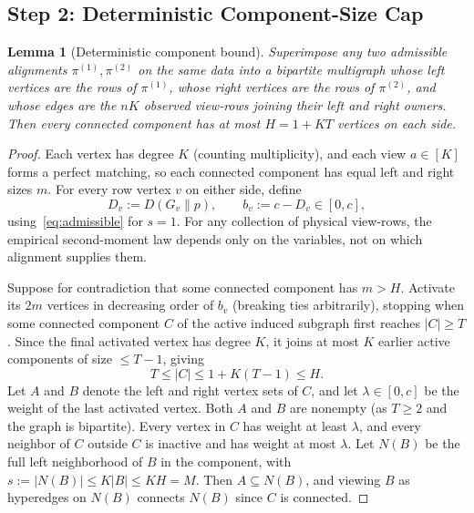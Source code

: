 \documentclass[11pt]{article}
\theoremstyle{plain}
\newtheorem{lemma}[theorem]{Lemma}
\theoremstyle{definition}
\theoremstyle{remark}
\begin{document}
\subsection{Step 2: Deterministic Component-Size Cap}

\begin{lemma}[Deterministic component bound]\label{lem:component}
Superimpose any two admissible alignments $\pi^{(1)}, \pi^{(2)}$ on the same data into a bipartite multigraph whose left vertices are the rows of $\pi^{(1)}$, whose right vertices are the rows of $\pi^{(2)}$, and whose edges are the $nK$ observed view-rows joining their left and right owners.
Then every connected component has at most $H = 1 + KT$ vertices on each side.
\end{lemma}

\begin{proof}
Each vertex has degree $K$ (counting multiplicity), and each view $a \in [K]$ forms a perfect matching, so each connected component has equal left and right sizes $m$.
For every row vertex $v$ on either side, define
\[
D_v := D(G_v \| p), \qquad b_v := c - D_v \in [0, c],
\]
using~\eqref{eq:admissible} for $s = 1$.
For any collection of physical view-rows, the empirical second-moment law depends only on the variables, not on which alignment supplies them.

Suppose for contradiction that some connected component has $m > H$.
Activate its $2m$ vertices in decreasing order of $b_v$ (breaking ties arbitrarily), stopping when some connected component $C$ of the active induced subgraph first reaches $|C| \ge T$.
Since the final activated vertex has degree $K$, it joins at most $K$ earlier active components of size $\le T - 1$, giving
\[
T \le |C| \le 1 + K(T - 1) \le H.
\]
Let $A$ and $B$ denote the left and right vertex sets of $C$, and let $\lambda \in [0, c]$ be the weight of the last activated vertex.
Both $A$ and $B$ are nonempty (as $T \ge 2$ and the graph is bipartite).
Every vertex in $C$ has weight at least $\lambda$, and every neighbor of $C$ outside $C$ is inactive and has weight at most $\lambda$.
Let $N(B)$ be the full left neighborhood of $B$ in the component, with $s := |N(B)| \le K|B| \le KH = M$.
Then $A \subseteq N(B)$, and viewing $B$ as hyperedges on $N(B)$ connects $N(B)$ since $C$ is connected.


\end{proof}
\end{document}
